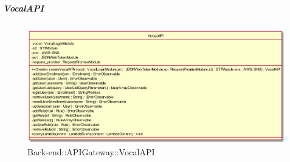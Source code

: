 \hypertarget{VocalAPI_label}{\subparagraph{VocalAPI}}
\begin{figure}[h]
	\centering
	\includegraphics[width=\textwidth,height=\textheight,keepaspectratio]{images/ClassVocalAPI.png}
	\caption{Back-end::APIGateway::VocalAPI}
\end{figure}
